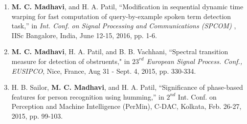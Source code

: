 \documentclass[10pt]{article}
\begin{document}
\begin{enumerate}[resume]
\item 	\textbf{M. C. Madhavi}, and H. A. Patil, ``Modification in sequential dynamic time warping for fast computation of query-by-example spoken term detection task,''  in \textit{Int. Conf. on Signal Processing and Communications (SPCOM)} , IISc Bangalore, India, June 12-15, 2016, pp. 1-6.

\item \textbf{M. C. Madhavi}, H. A. Patil, and B. B. Vachhani, ``Spectral transition measure for detection of obstruents," in \textit{$23^{rd}$ European
Signal Process. Conf., EUSIPCO}, Nice, France, Aug 31 - Sept. 4, 2015, pp. 330-334.

\item H. B. Sailor, \textbf{M. C. Madhavi}, and H. A. Patil, ``Significance of phase-based features for person recognition using humming,'' in $2^{nd}$ Int. Conf. on Perception and Machine Intelligence (PerMin), C-DAC, Kolkata, Feb. 26-27, 2015, pp. 99-103. 


\end{enumerate}
\end{document}
